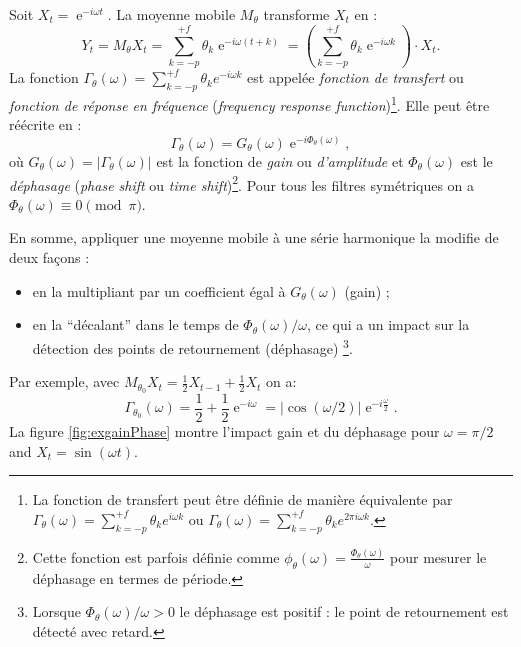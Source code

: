 \documentclass[
  11pt,
  french,
  a4paper]{article}
\DeclareMathOperator{\e}{e}
\newcommand\1{\mathds{1}}
\begin{document}
Soit \(X_t=\e^{-i\omega t}\). La moyenne mobile \(M_\theta\) transforme \(X_t\) en :
\[
Y_t = M_{\theta}X_t = \sum_{k=-p}^{+f} \theta_k \e^{-i \omega (t+k)}
= \left(\sum_{k=-p}^{+f} \theta_k \e^{-i \omega k}\right)\cdot X_t.
\]
La fonction \(\Gamma_\theta(\omega)=\sum_{k=-p}^{+f} \theta_k e^{-i \omega k}\) est appelée \emph{fonction de transfert} ou \emph{fonction de réponse en fréquence} (\emph{frequency response function})\footnote{
  La fonction de transfert peut être définie de manière équivalente par \(\Gamma_\theta(\omega)=\sum_{k=-p}^{+f} \theta_k e^{i \omega k}\) ou \(\Gamma_\theta(\omega)=\sum_{k=-p}^{+f} \theta_k e^{2\pi i \omega k}\).}.
Elle peut être réécrite en :
\[
\Gamma_\theta(\omega) = G_\theta(\omega)\e^{-i\Phi_\theta(\omega)},
\]
où \(G_\theta(\omega)=\lvert\Gamma_\theta(\omega)\rvert\) est la fonction de \emph{gain} ou \emph{d'amplitude} et \(\Phi_\theta(\omega)\) est le \emph{déphasage} (\emph{phase shift} ou \emph{time shift})\footnote{
  Cette fonction est parfois définie comme \(\phi_\theta(\omega)=\frac{\Phi_\theta(\omega)}{\omega}\) pour mesurer le déphasage en termes de période.}.
Pour tous les filtres symétriques on a \(\Phi_\theta(\omega)\equiv 0 \pmod{\pi}\).

En somme, appliquer une moyenne mobile à une série harmonique la modifie de deux façons :

\begin{itemize}
\item
  en la multipliant par un coefficient égal à \(G_{\theta}\left(\omega\right)\) (gain) ;
\item
  en la ``décalant'' dans le temps de \(\Phi_\theta(\omega)/\omega\), ce qui a un impact sur la détection des points de retournement (déphasage) \footnote{
    Lorsque \(\Phi_\theta(\omega)/\omega>0\) le déphasage est positif : le point de retournement est détecté avec retard.}.
\end{itemize}

Par exemple, avec \(M_{\theta_0}X_t=\frac{1}{2}X_{t-1}+\frac{1}{2}X_{t}\) on a:
\[
\Gamma_{\theta_0}(\omega)=\frac{1}{2}+\frac{1}{2}\e^{-i\omega}
=\lvert\cos(\omega/2)\rvert\e^{-i\frac{\omega}{2}}.
\]
La figure \ref{fig:exgainPhase} montre l'impact gain et du déphasage pour \(\omega=\pi/2\) and \(X_t=\sin(\omega t)\).
\end{document}
